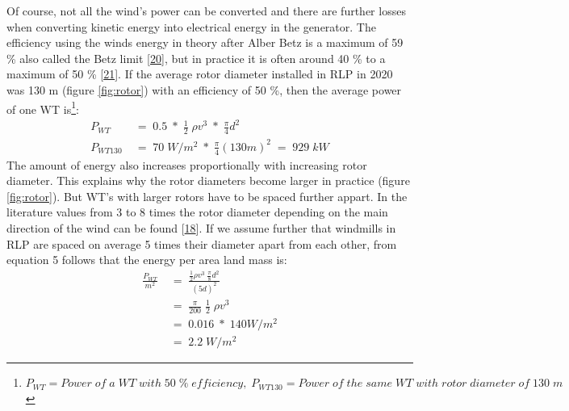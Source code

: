 \documentclass[a4paper,11pt]{article}
\begin{document}
Of course, not all the wind's power can be converted and there are further losses when converting kinetic energy into electrical energy in the generator. The efficiency using the winds energy in theory after Alber Betz is a maximum of 59 \% also called the Betz limit {[}\protect\hyperlink{ref-A.Betz.1920}{20}{]}, but in practice it is often around 40 \% to a maximum of 50 \% {[}\protect\hyperlink{ref-WindwartsEnergieausdemNorden.2021}{21}{]}. If the average rotor diameter installed in RLP in 2020 was 130 m (figure \ref{fig:rotor}) with an efficiency of 50 \%, then the average power of one WT is\footnote{\(P_{WT}=Power\; of\; a\; WT\; with\; 50\; \%\; efficiency,\; P_{WT130}=Power\; of\; the\; same\; WT\; with\; rotor\; diameter\; of\; 130\; m\)}:
\begin{equation}
\begin{split}
P_{WT}\; & =\; 0.5\; *\; \frac{1}{2}\; \rho v^3\; *\; \frac{\pi}{4}d^2 \\
P_{WT130}\; & =\; 70\; W/m^2\; *\; \frac{\pi}{4}(130 m)^2\; =\; 929\; kW
\end{split}
\end{equation}
The amount of energy also increases proportionally with increasing rotor diameter. This explains why the rotor diameters become larger in practice (figure \ref{fig:rotor}). But WT's with larger rotors have to be spaced further appart. In the literature values from 3 to 8 times the rotor diameter depending on the main direction of the wind can be found {[}\protect\hyperlink{ref-DavidJCMacKay.2009}{18}{]}. If we assume further that windmills in RLP are spaced on average 5 times their diameter apart from each other, from equation 5 follows that the energy per area land mass is:
\begin{equation}
\begin{split}
\frac{P_{WT}}{m^2}\; & =\; \frac{\frac{1}{2} \rho v^3\; \frac{\pi}{8}d^2}{(5d)^2} \\
 & =\; \frac{\pi}{200}\; \frac{1}{2}\; \rho v^3 \\
 & =\; 0.016\; *\; 140 W/m^2 \\
 & =\; 2.2\; W/m^2
\end{split}
\end{equation}
\end{document}
